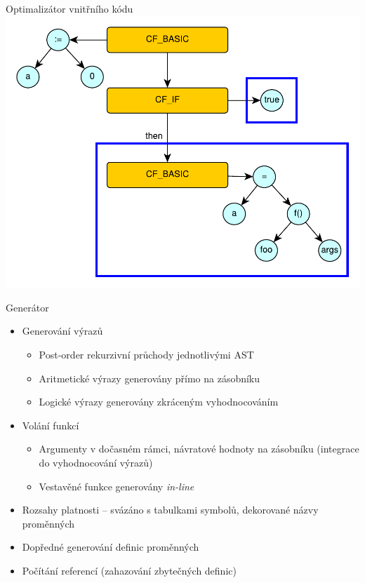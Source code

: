 \documentclass[10pt,xcolor=pdflatex,hyperref={unicode,hidelinks}]{beamer}
\begin{document}
\begin{frame}{Optimalizátor vnitřního kódu}
{    \includegraphics[height=0.8\textheight]{img/optimise3.pdf}}
\end{frame}

\begin{frame}{Generátor}
    \begin{itemize}
        \item Generování výrazů
        \begin{itemize}
            \item Post-order rekurzivní průchody jednotlivými AST
            \item Aritmetické výrazy generovány přímo na zásobníku
            \item Logické výrazy generovány zkráceným vyhodnocováním
        \end{itemize}
        \item Volání funkcí
        \begin{itemize}
            \item Argumenty v dočasném rámci, návratové hodnoty na zásobníku (integrace do vyhodnocování výrazů)
            \item Vestavěné funkce generovány \textit{in-line}
        \end{itemize}
        \item Rozsahy platnosti -- svázáno s tabulkami symbolů, dekorované názvy proměnných
        \item Dopředné generování definic proměnných
        \item Počítání referencí (zahazování zbytečných definic)
    \end{itemize}
\end{frame}
\end{document}
